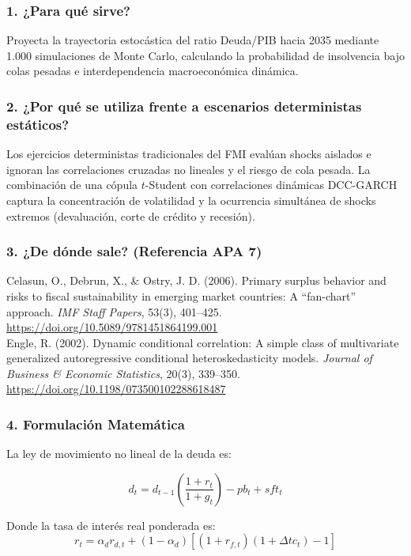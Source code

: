 \documentclass[11pt,a4paper]{article}
\begin{document}
\subsubsection{1. ¿Para qué sirve?}
Proyecta la trayectoria estocástica del ratio Deuda/PIB hacia 2035 mediante 1.000 simulaciones de Monte Carlo, calculando la probabilidad de insolvencia bajo colas pesadas e interdependencia macroeconómica dinámica.

\subsubsection{2. ¿Por qué se utiliza frente a escenarios deterministas estáticos?}
Los ejercicios deterministas tradicionales del FMI evalúan shocks aislados e ignoran las correlaciones cruzadas no lineales y el riesgo de cola pesada. La combinación de una cópula $t$-Student con correlaciones dinámicas DCC-GARCH captura la concentración de volatilidad y la ocurrencia simultánea de shocks extremos (devaluación, corte de crédito y recesión).

\subsubsection{3. ¿De dónde sale? (Referencia APA 7)}
\begin{mdframed}[style=apabox]
Celasun, O., Debrun, X., \& Ostry, J. D. (2006). Primary surplus behavior and risks to fiscal sustainability in emerging market countries: A ``fan-chart'' approach. \textit{IMF Staff Papers}, 53(3), 401--425. \url{https://doi.org/10.5089/9781451864199.001}\\
Engle, R. (2002). Dynamic conditional correlation: A simple class of multivariate generalized autoregressive conditional heteroskedasticity models. \textit{Journal of Business \& Economic Statistics}, 20(3), 339--350. \url{https://doi.org/10.1198/073500102288618487}
\end{mdframed}

\subsubsection{4. Formulación Matemática}
La ley de movimiento no lineal de la deuda es:

\begin{equation}
d_t = d_{t-1} \left( \frac{1 + r_t}{1 + g_t} \right) - pb_t + sft_t
\end{equation}

Donde la tasa de interés real ponderada es:
\begin{equation}
r_t = \alpha_d r_{d,t} + (1 - \alpha_d) \left[ (1 + r_{f,t})(1 + \Delta tc_t) - 1 \right]
\end{equation}
\end{document}
